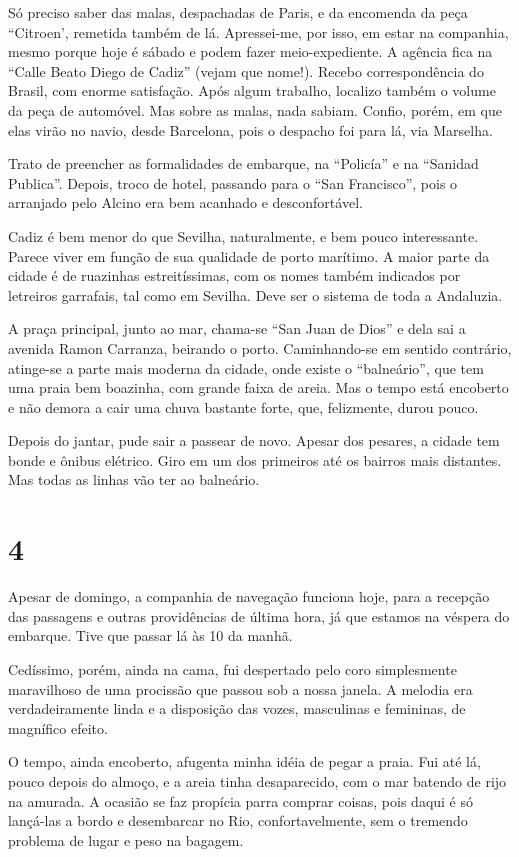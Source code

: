 Só preciso saber das malas, despachadas de Paris, e da encomenda da peça “Citroen’, remetida também de lá. Apressei-me, por isso, em estar na companhia, mesmo porque hoje é sábado e podem fazer meio-expediente. A agência fica na “Calle Beato Diego de Cadiz” (vejam que nome!). Recebo correspondência do Brasil, com enorme satisfação. Após algum trabalho, localizo também o volume da peça de automóvel. Mas sobre as malas, nada sabiam. Confio, porém, em que elas virão no navio, desde Barcelona, pois o despacho foi para lá, via Marselha.

Trato de preencher as formalidades de embarque, na “Policía” e na “Sanidad Publica”. Depois, troco de hotel, passando para o “San Francisco”, pois o arranjado pelo Alcino era bem acanhado e desconfortável.

Cadiz é bem menor do que Sevilha, naturalmente, e bem pouco interessante. Parece viver em função de sua qualidade de porto marítimo. A maior parte da cidade é de ruazinhas estreitíssimas, com os nomes também indicados por letreiros garrafais, tal como em Sevilha. Deve ser o sistema de toda a Andaluzia.

A praça principal, junto ao mar, chama-se “San Juan de Dios” e dela sai a avenida Ramon Carranza, beirando o porto. Caminhando-se em sentido contrário, atinge-se a parte mais moderna da cidade, onde existe o “balneário”, que tem uma praia bem boazinha, com grande faixa de areia. Mas o tempo está encoberto e não demora a cair uma chuva bastante forte, que, felizmente, durou pouco.

Depois do jantar, pude sair a passear de novo. Apesar dos pesares, a cidade tem bonde e ônibus elétrico. Giro em um dos primeiros até os bairros mais distantes. Mas todas as linhas vão ter ao balneário.

\section*{4 \adfflatleafright {}}
Apesar de domingo, a companhia de navegação funciona hoje, para a recepção das passagens e outras providências de última hora, já que estamos na véspera do embarque. Tive que passar lá às 10 da manhã.

Cedíssimo, porém, ainda na cama, fui despertado pelo coro simplesmente maravilhoso de uma procissão que passou sob a nossa janela. A melodia era verdadeiramente linda e a disposição das vozes, masculinas e femininas, de magnífico efeito.

O tempo, ainda encoberto, afugenta minha idéia de pegar a praia. Fui até lá, pouco depois do almoço, e a areia tinha desaparecido, com o mar batendo de rijo na amurada. A ocasião se faz propícia parra comprar coisas, pois daqui é só lançá-las a bordo e desembarcar no Rio, confortavelmente, sem o tremendo problema de lugar e peso na bagagem.

